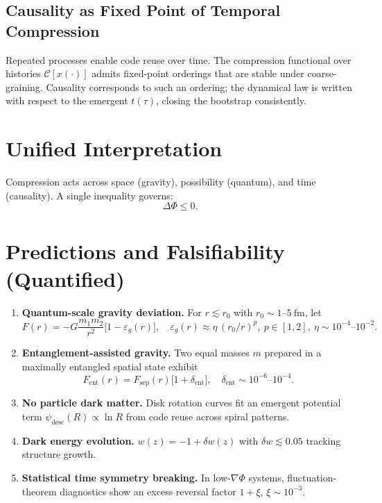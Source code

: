 \documentclass[aps,preprint,onecolumn,longbibliography,nofootinbib]{revtex4-2}
\numberwithin{equation}{section}
\begin{document}
\subsection{Causality as Fixed Point of Temporal Compression}
Repeated processes enable code reuse over time. The compression functional over histories $\mathcal{C}[x(\cdot)]$ admits fixed-point orderings that are stable under coarse-graining. Causality corresponds to such an ordering; the dynamical law is written with respect to the emergent $t(\tau)$, closing the bootstrap consistently.

\section{Unified Interpretation}
Compression acts across space (gravity), possibility (quantum), and time (causality). A single inequality governs:
\begin{equation}
\boxed{\Delta \Phi \le 0.} \label{eq:law}
\end{equation}

\section{Predictions and Falsifiability (Quantified)}
\begin{enumerate}
\item \textbf{Quantum-scale gravity deviation.} For $r\lesssim r_0$ with $r_0\sim 1$--$5~\mathrm{fm}$, let
\[
F(r) = -G\frac{m_1m_2}{r^2}\Big[1-\varepsilon_g(r)\Big],\quad \varepsilon_g(r)\approx \eta\,(r_0/r)^p,\ p\in[1,2],\ \eta\sim 10^{-4}\text{--}10^{-2}.
\]
\item \textbf{Entanglement-assisted gravity.} Two equal masses $m$ prepared in a maximally entangled spatial state exhibit
\[
F_{\text{ent}}(r)=F_{\text{sep}}(r)\big[1+\delta_{\mathrm{ent}}\big],\quad \delta_{\mathrm{ent}}\sim 10^{-6}\text{--}10^{-4}.
\]
\item \textbf{No particle dark matter.} Disk rotation curves fit an emergent potential term $\psi_{\text{desc}}(R)\propto \ln R$ from code reuse across spiral patterns.
\item \textbf{Dark energy evolution.} $w(z)=-1+\delta w(z)$ with $\delta w\lesssim 0.05$ tracking structure growth.
\item \textbf{Statistical time symmetry breaking.} In low-$\nabla\Phi$ systems, fluctuation-theorem diagnostics show an excess reversal factor $1+\xi$, $\xi\sim10^{-3}$.
\end{enumerate}
\end{document}
